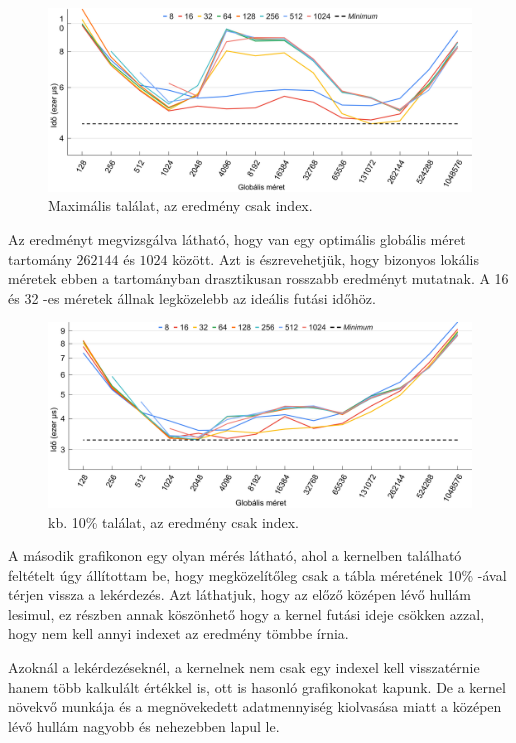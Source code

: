 \begin{figure}[h!]
\centering
\includegraphics[width=\textwidth]{images/graph/global_size_1.png}
\caption{Maximális találat, az eredmény csak index.}
\label{fig:schema}
\end{figure}

Az eredményt megvizsgálva látható, hogy van egy optimális globális méret tartomány $262144$ és $1024$ között.
Azt is észrevehetjük, hogy bizonyos lokális méretek ebben a tartományban drasztikusan rosszabb eredményt mutatnak.
A 16 és 32 -es méretek állnak legközelebb az ideális futási időhöz.

\begin{figure}[h!]
\centering
\includegraphics[width=\textwidth]{images/graph/global_size_2.png}
\caption{kb. 10\% találat, az eredmény csak index.}
\label{fig:schema}
\end{figure}

A második grafikonon egy olyan mérés látható, ahol a kernelben található feltételt úgy állítottam be, hogy megközelítőleg csak a tábla méretének 10\% -ával térjen vissza a lekérdezés.
Azt láthatjuk, hogy az előző középen lévő hullám lesimul, ez részben annak köszönhető hogy a kernel futási ideje csökken azzal, hogy nem kell annyi indexet az eredmény tömbbe írnia.

Azoknál a lekérdezéseknél, a kernelnek nem csak egy indexel kell visszatérnie hanem több kalkulált értékkel is, ott is hasonló grafikonokat kapunk. De a kernel növekvő munkája és a megnövekedett adatmennyiség kiolvasása miatt a középen lévő hullám nagyobb és nehezebben lapul le.

